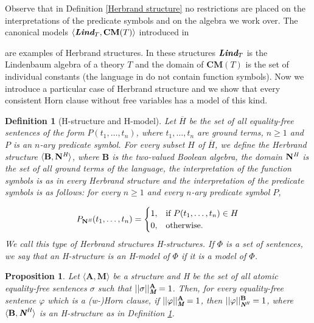 \documentclass{IOS-Book-Article}
\newtheorem{proposition}{Proposition}
\newtheorem{defi}{Definition}
\begin{document}
Observe that in Definition \ref{Herbrand structure} no restrictions are placed on the interpretations of the predicate symbols and on the algebra we work over. The canonical models $\langle\emph{\textbf{Lind}}_{T},\mathbf{CM}(T)\rangle$ introduced in {\cite[Def.9]{CiHa06} are examples of Herbrand structures. In these structures $\emph{\textbf{Lind}}_{T}$ is the Lindenbaum algebra of a theory $T$ and the domain of $\mathbf{CM}(T)$ is the set of individual constants (the language in \cite{CiHa06} do not contain function symbols). Now we introduce a particular case of Herbrand structure and we show that every consistent Horn clause without free variables has a model of this kind.


\begin{defi}  [H-structure and H-model] \label{Herbrand boolean} Let $\overline{H}$ be the set of all \newline
equality-free sentences of the form $P(t_1,\ldots,t_n)$, where $t_1,\ldots,t_n$ are ground terms, $n\geq 1$ and $P$ is an $n$-ary predicate symbol. For every subset $H$ of $\overline{H}$, we define the Herbrand structure $\langle\textbf{B},\mathbf{N}^{\emph{H}}\rangle$, where $\textbf{B}$ is the two-valued Boolean algebra, the domain $\mathbf{N}^{\emph{H}}$ is the set of all ground terms of the language, the interpretation of the function symbols is as in every Herbrand structure and the interpretation of the predicate symbols is as follows: for every $n\geq 1$ and every $n$-ary predicate symbol $P$, 



$$ P_{\mathrm{\mathbf{N}}^{\emph{H}}}(t_1,\ldots,t_n)=\begin{cases} 1, & \mbox{if } P(t_1,\ldots,t_n) \in H \\ 0, & \mbox{otherwise. } \end{cases}  $$
We call this type of Herbrand structures \emph{H-structures}. If $\Phi$ is a set of sentences, we say that an \emph{H}-structure is an \emph{H-model} of $\Phi$ if it is a model of $\Phi$.


 \end{defi}

\begin{proposition} \label{proposition} Let $\langle\textbf{A},\mathbf{M}\rangle$ be a structure and H be the set of all atomic equality-free sentences $\sigma$ such that $||\sigma||^{\textbf{A}}_{\emph{\textbf{M}}}=1$. Then, for every equality-free sentence $\varphi$ which is a (w-)Horn clause,  if $||\varphi||^{\textbf{A}}_{\emph{\textbf{M}}}=1$, then $||\varphi||^{\textbf{B}}_{\emph{\textbf{N}}^{\emph{H}}}=1$, where $\langle\textbf{B},\emph{\textbf{N}}^{\emph{H}}\rangle$ is an \emph{H}-structure as in Definition \ref{Herbrand boolean}.
\end{proposition}

}
\end{document}
